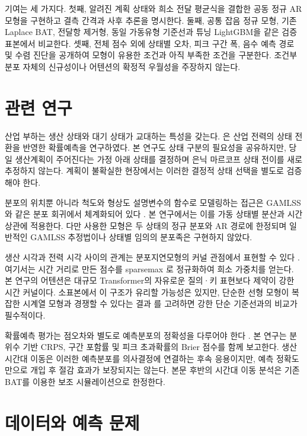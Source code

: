\documentclass[letterpaper]{article}
\begin{document}
기여는 세 가지다. 첫째, 알려진 계획 상태와 희소 전달 평균식을 결합한 공동 정규 AR 모형을 구현하고 결측 간격과 사후 추론을 명시한다. 둘째, 공통 잡음 정규 모형, 기존 Laplace BAT, 전달항 제거형, 동일 가동유형 기준선과 튜닝 LightGBM을 같은 검증 표본에서 비교한다. 셋째, 전체 점수 외에 상태별 오차, 피크 구간 폭, 음수 예측 경로 및 수렴 진단을 공개하여 모형이 유용한 조건과 아직 부족한 조건을 구분한다. 조건부 분포 자체의 신규성이나 어텐션의 확정적 우월성을 주장하지 않는다.

\section{관련 연구}
산업 부하는 생산 상태와 대기 상태가 교대하는 특성을 갖는다. \citet{berk2018regime}은 산업 전력의 상태 전환을 반영한 확률예측을 연구하였다. 본 연구도 상태 구분의 필요성을 공유하지만, 당일 생산계획이 주어진다는 가정 아래 상태를 결정하며 은닉 마르코프 상태 전이를 새로 추정하지 않는다. 계획이 불확실한 현장에서는 이러한 결정적 상태 선택을 별도로 검증해야 한다.

분포의 위치뿐 아니라 척도와 형상도 설명변수의 함수로 모델링하는 접근은 GAMLSS와 같은 분포 회귀에서 체계화되어 있다 \citep{rigby2005gamlss}. 본 연구에서는 이를 가동 상태별 분산과 시간상관에 적용한다. 다만 사용한 모형은 두 상태의 정규 분포와 AR 경로에 한정되며 일반적인 GAMLSS 추정법이나 상태별 임의의 분포족은 구현하지 않았다.

생산 시각과 전력 시각 사이의 관계는 분포지연모형의 커널 관점에서 표현할 수 있다 \citep{welty2009bdlm}. 여기서는 시간 거리로 만든 점수를 sparsemax \citep{martins2016sparsemax}로 정규화하여 희소 가중치를 얻는다. 본 연구의 어텐션은 대규모 Transformer의 자유로운 질의·키 표현보다 제약이 강한 시간 커널이다. 소표본에서 이 구조가 유리할 가능성은 있지만, 단순한 선형 모형이 복잡한 시계열 모형과 경쟁할 수 있다는 결과 \citep{zeng2023dlinear}를 고려하면 강한 단순 기준선과의 비교가 필수적이다.

확률예측 평가는 점오차와 별도로 예측분포의 정확성을 다루어야 한다 \citep{gneiting2007scoring}. 본 연구는 분위수 기반 CRPS, 구간 포함률 및 피크 초과확률의 Brier 점수를 함께 보고한다. 생산 시간대 이동은 이러한 예측분포를 의사결정에 연결하는 후속 응용이지만, 예측 정확도만으로 개입 후 절감 효과가 보장되지는 않는다. 본문 후반의 시간대 이동 분석은 기존 BAT를 이용한 보조 시뮬레이션으로 한정한다.

\section{데이터와 예측 문제}
\end{document}
